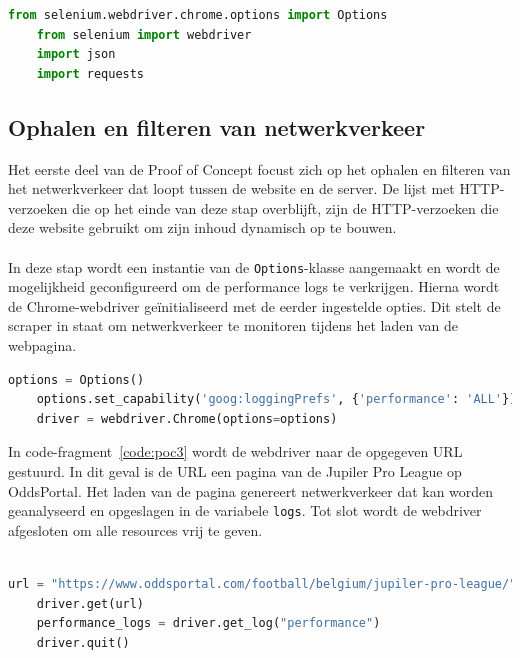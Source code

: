 \begin{lstlisting}[language=python, captionpos=b, caption={De imports voor Proof of Concept.}, label={code:poc1}]
    from selenium.webdriver.chrome.options import Options
    from selenium import webdriver
    import json
    import requests
\end{lstlisting}

\subsection{Ophalen en filteren van netwerkverkeer}
Het eerste deel van de Proof of Concept focust zich op het ophalen en filteren van het netwerkverkeer dat loopt tussen de website en de server. De lijst met HTTP-verzoeken die op het einde van deze stap overblijft, zijn de HTTP-verzoeken die deze website gebruikt om zijn inhoud dynamisch op te bouwen.
\\ \\
In deze stap wordt een instantie van de \texttt{Options}-klasse aangemaakt en wordt de mogelijkheid geconfigureerd om de performance logs te verkrijgen. Hierna wordt de Chrome-webdriver geïnitialiseerd  met de eerder ingestelde opties. Dit stelt de scraper in staat om netwerkverkeer te monitoren tijdens het laden van de webpagina.
\begin{lstlisting}[language=python, captionpos=b, caption={De imports voor Proof of Concept.}, label={code:poc2}]
    options = Options()
    options.set_capability('goog:loggingPrefs', {'performance': 'ALL'})
    driver = webdriver.Chrome(options=options)
\end{lstlisting}

In code-fragment~\ref{code:poc3} wordt de webdriver naar de opgegeven URL gestuurd. In dit geval is de URL een pagina van de Jupiler Pro League op OddsPortal. Het laden van de pagina genereert netwerkverkeer dat kan worden geanalyseerd en opgeslagen in de variabele \texttt{logs}. Tot slot wordt de webdriver afgesloten om alle resources vrij te geven.
\\ \\

\begin{lstlisting}[language=python, captionpos=b, caption={Ophalen van het netwerkverkeer}, label={code:poc3}]
    url = "https://www.oddsportal.com/football/belgium/jupiler-pro-league/"
    driver.get(url)
    performance_logs = driver.get_log("performance")
    driver.quit()
\end{lstlisting}

